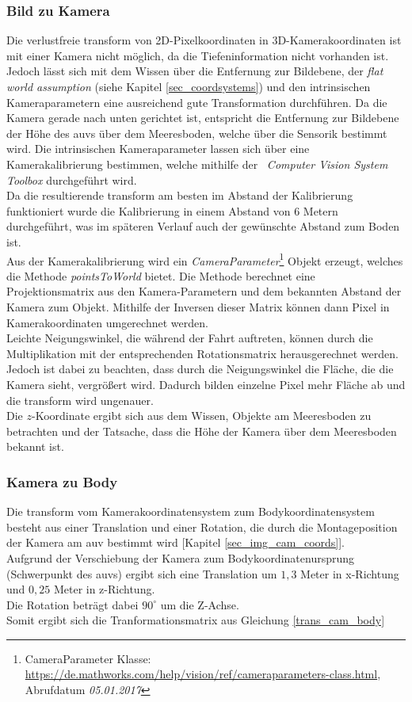 \subsubsection{Bild zu Kamera}
\label{section_PicToCam}
Die verlustfreie \gls{transform} von 2D-Pixelkoordinaten in 3D-Kamerakoordinaten ist mit einer Kamera nicht möglich, da die Tiefeninformation nicht vorhanden ist. Jedoch lässt sich mit dem Wissen über die Entfernung zur Bildebene, der \textit{flat world assumption} (siehe Kapitel \ref{sec_coordsystems}) und den intrinsischen Kameraparametern eine ausreichend gute Transformation durchführen. Da die Kamera gerade nach unten gerichtet ist, entspricht die Entfernung zur Bildebene der Höhe des \gls{auv}s über dem Meeresboden, welche über die Sensorik bestimmt wird. Die intrinsischen Kameraparameter lassen sich über eine Kamerakalibrierung bestimmen, welche mithilfe der \matlab\ \textit{Computer Vision System Toolbox} durchgeführt wird.\\
Da die resultierende \gls{transform} am besten im Abstand der Kalibrierung funktioniert wurde die Kalibrierung in einem Abstand von 6 Metern durchgeführt, was im späteren Verlauf auch der gewünschte Abstand zum Boden ist.\\
Aus der Kamerakalibrierung wird ein \textit{CameraParameter}\footnote{CameraParameter Klasse: \url{https://de.mathworks.com/help/vision/ref/cameraparameters-class.html}, Abrufdatum \textit{05.01.2017}} Objekt erzeugt, welches die Methode \textit{pointsToWorld} bietet. Die Methode berechnet eine Projektionsmatrix aus den Kamera-Parametern und dem bekannten Abstand der Kamera zum Objekt. Mithilfe der Inversen dieser Matrix können dann Pixel in Kamerakoordinaten umgerechnet werden.\\
Leichte Neigungswinkel, die während der Fahrt auftreten, können durch die Multiplikation mit der entsprechenden Rotationsmatrix herausgerechnet werden. Jedoch ist dabei zu beachten, dass durch die Neigungswinkel die Fläche, die die Kamera sieht, vergrößert wird. Dadurch bilden einzelne Pixel mehr Fläche ab und die \gls{transform} wird ungenauer.\\
Die $z$-Koordinate ergibt sich aus dem Wissen, Objekte am Meeresboden zu betrachten und der Tatsache, dass die Höhe der Kamera über dem Meeresboden bekannt ist.

\subsubsection{Kamera zu Body}
Die \gls{transform} vom Kamerakoordinatensystem zum Bodykoordinatensystem besteht aus einer Translation und einer Rotation, die durch die Montageposition der Kamera am \gls{auv} bestimmt wird [Kapitel \ref{sec_img_cam_coords}].\\
Aufgrund der Verschiebung der Kamera zum Bodykoordinatenursprung (Schwerpunkt des \gls{auv}s) ergibt sich eine Translation um $1,3$ Meter in x-Richtung und $0,25$ Meter in z-Richtung.\\
Die Rotation beträgt dabei $90^\circ$ um die Z-Achse.\\
Somit ergibt sich die Tranformationsmatrix aus Gleichung \ref{trans_cam_body}\\

